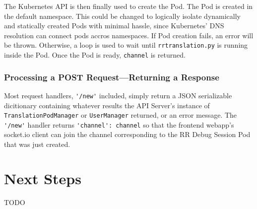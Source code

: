 \documentclass[12pt]{article}
\begin{document}
The Kubernetes API is then finally used to create the Pod.  The Pod is
created in the default namespace.  This could be changed to logically
isolate dynamically and statically created Pods with minimal hassle,
since Kubernetes' DNS resolution can connect pods accros namespaces.
If Pod creation fails, an error will be thrown.  Otherwise, a loop is
used to wait until \lstinline{rrtranslation.py} is running inside the
Pod.  Once the Pod is ready, \lstinline{channel} is returned.

\subsubsection{Processing a POST Request---Returning a Response}

Most request handlers, \lstinline{'/new'} included, simply return a
JSON serializable dicitionary containing whatever results the API
Server's instance of \lstinline{TranslationPodManager} or
\lstinline{UserManager} returned, or an error message.  The
\lstinline{'/new'} handler returns \lstinline{'channel': channel} so
that the frontend webapp's socket.io client can join the channel
corresponding to the RR Debug Session Pod that was just created.

\section{Next Steps} \label{next}

TODO

\pagebreak

{}
\end{document}
